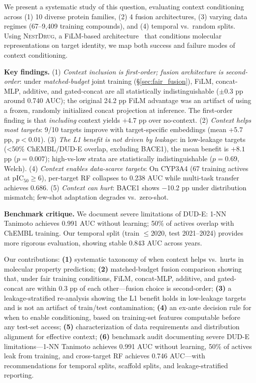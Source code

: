 \documentclass[sigconf]{acmart}
\newcommand{\methodname}{\textsc{NestDrug}}
\begin{document}
We present a systematic study of this question, evaluating context conditioning across (1) 10 diverse protein families, (2) 4 fusion architectures, (3) varying data regimes (67--9{,}409 training compounds), and (4) temporal vs.\ random splits. Using \methodname{}, a FiLM-based architecture~\cite{perez_2018_film} that conditions molecular representations on target identity, we map both success and failure modes of context conditioning.

\textbf{Key findings.} (1) \textit{Context inclusion is first-order; fusion architecture is second-order}: under \emph{matched-budget} joint training (\S\ref{sec:fair_fusion}), FiLM, concat-MLP, additive, and gated-concat are all statistically indistinguishable ($\pm 0.3$ pp around 0.740 AUC); the original 24.2 pp FiLM advantage was an artifact of using a frozen, randomly initialized concat projection at inference. The first-order finding is that \emph{including} context yields $+4.7$ pp over no-context. (2) \textit{Context helps most targets}: 9/10 targets improve with target-specific embeddings (mean +5.7 pp, $p < 0.01$). (3) \textit{The L1 benefit is not driven by leakage}: in low-leakage targets (\textless 50\% ChEMBL/DUD-E overlap, excluding BACE1), the mean benefit is $+8.1$ pp ($p = 0.007$); high-vs-low strata are statistically indistinguishable ($p = 0.69$, Welch). (4) \textit{Context enables data-scarce targets}: On CYP3A4 (67 training actives at pIC$_{50}\geq 6$), per-target RF collapses to 0.238 AUC while multi-task transfer achieves 0.686. (5) \textit{Context can hurt}: BACE1 shows $-$10.2 pp under distribution mismatch; few-shot adaptation degrades vs.\ zero-shot.

\textbf{Benchmark critique.} We document severe limitations of DUD-E: 1-NN Tanimoto achieves 0.991 AUC without learning; 50\% of actives overlap with ChEMBL training. Our temporal split (train $\leq$2020, test 2021--2024) provides more rigorous evaluation, showing stable 0.843 AUC across years.

Our contributions: \textbf{(1)} systematic taxonomy of when context helps vs.\ hurts in molecular property prediction; \textbf{(2)} matched-budget fusion comparison showing that, under fair training conditions, FiLM, concat-MLP, additive, and gated-concat are within 0.3 pp of each other---fusion choice is second-order; \textbf{(3)} a leakage-stratified re-analysis showing the L1 benefit holds in low-leakage targets and is not an artifact of train/test contamination; \textbf{(4)} an ex-ante decision rule for when to enable conditioning, based on training-set features computable before any test-set access; \textbf{(5)} characterization of data requirements and distribution alignment for effective context; \textbf{(6)} benchmark audit documenting severe DUD-E limitations---1-NN Tanimoto achieves 0.991 AUC without learning, 50\% of actives leak from training, and cross-target RF achieves 0.746 AUC---with recommendations for temporal splits, scaffold splits, and leakage-stratified reporting.
\end{document}
